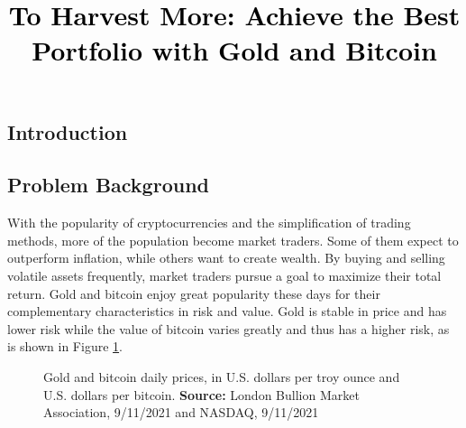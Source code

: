 \documentclass[12pt,a4paper]{article}
\newcommand{\PaperTitle}{To Harvest More: Achieve the Best Portfolio with Gold and Bitcoin}  %
\begin{document}
\thispagestyle{empty}


\newpage

\title{
\Large{\textcolor{black}{\PaperTitle}}
}




\maketitle



\tableofcontents
\setcounter{tocdepth}{2}

\newpage
\setcounter{page}{1}


\begin{spacing}{1.2} 



\section{Introduction}
\label{Problem_Statement}

\subsection{Problem Background}
With the popularity of cryptocurrencies and the simplification of trading methods, more of the population become market traders. Some of them expect to outperform inflation, while others want to create wealth. By buying and selling volatile assets frequently, market traders pursue a goal to maximize their total return. Gold and bitcoin enjoy great popularity these days for their complementary characteristics in risk and value. Gold is stable in price and has lower risk while the value of bitcoin varies greatly and thus has a higher risk, as is shown in Figure \ref{figure:prices2in1}.

\begin{figure}[H]
	\caption{Gold and bitcoin daily prices, in U.S. dollars per troy ounce and U.S. dollars per bitcoin. \textbf{Source:} London Bullion Market 
		Association, 9/11/2021 and NASDAQ, 9/11/2021 }
	\label{figure:prices2in1}
\end{figure}


\end{spacing}
\end{document}
